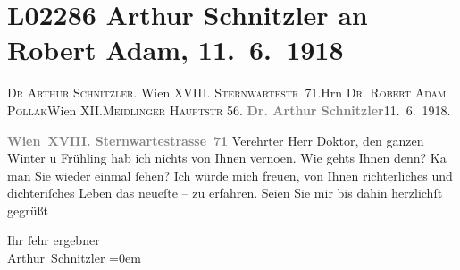 

\section[Arthur Schnitzler an Robert Adam, 11. 6. 1918]{L02286 Arthur Schnitzler an Robert Adam, 11. 6. 1918}
\nopagebreak{}
\rehead{ }\normalsize\beginnumbering{}
\toendnotes[C]{\smallbreak\pagebreak[2]}
\pstart{}{\pb}\textsc{Dr Arthur Schnitzler}. Wien
                     XVIII. \textsc{Sternwartestr} 71.\pend{}{\bigskip}\pstart{}{\pb}Hrn \textsc{Dr. Robert Adam Pollak}\pend{}\pstart{}Wien XII.\pend{}\pstart{}\textsc{Meidlinger Hauptstr} 56.\pend{}{\bigskip}\vspace{1em}
\pstart
           {\pb}\textcolor{gray}{\textbf{Dr. Arthur Schnitzler}}\hfill 11. 6. 1918.\pend
           
\pstart
           \textcolor{gray}{\textbf{Wien XVIII. Sternwartestrasse 71}}\pend
           \vspace{0.5em}
\pstart
           Verehrter Herr Doktor, den ganzen Winter u Frühling hab ich nichts
               von Ihnen verno{\geminationm}en. Wie gehts Ihnen denn? Ka{\geminationn} man Sie wieder einmal ſehen? Ich würde mich freuen,
               von Ihnen richterliches und dichteriſches Leben \introOben{}das neueſte
                  –\introOben{} zu erfahren. Seien Sie {\pb}mir bis dahin herzlichſt
               gegrüßt\pend
           
\pstart
           Ihr ſehr ergebner{\\[\baselineskip]}\spacefill\mbox{Arthur Schnitzler}\pend
           \leftskip=0em{}\endnumbering{}  
      